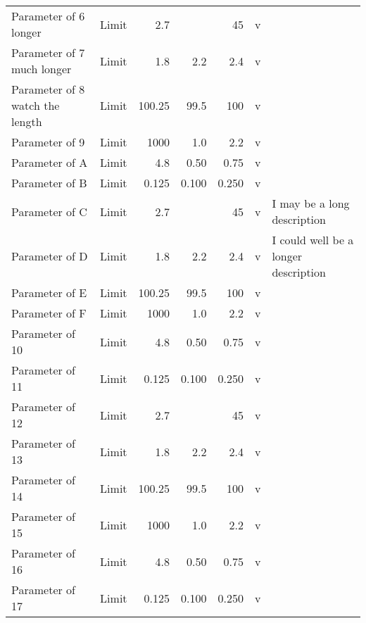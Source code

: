 \documentclass{article}
\begin{document}
\begin{ThreePartTable}
\begin{longtable}{p{5.5cm}lrrrlm{5.75cm}}
			
			\toprule
			\ltsubcap{Internal Voltage Rails}
			
			Parameter of 6 longer           & Limit         & 2.7       &           & 45        & v         &   \\
			Parameter of 7 much longer      & Limit         & 1.8       & 2.2       & 2.4       & v         &   \\
			Parameter of 8 watch the length & Limit         & 100.25    & 99.5      & 100       & v         &   \\
			Parameter of 9      & Limit     & 1000      & 1.0       & 2.2       & v         &   \\
			Parameter of A      & Limit     & 4.8       & 0.50      & 0.75      & v     &   \\
			Parameter of B      & Limit     & 0.125     & 0.100     & 0.250     & v         &   \\
			
			Parameter of C      & Limit         & 2.7       &           & 45        & v         &   I may be a long description \\
			Parameter of D      & Limit         & 1.8       & 2.2       & 2.4       & v         &   I could well be a longer description\\
			Parameter of E      & Limit         & 100.25    & 99.5      & 100       & v         &   \\
			Parameter of F      & Limit     & 1000      & 1.0       & 2.2       & v         &   \\
			Parameter of 10     & Limit     & 4.8       & 0.50      & 0.75      & v     &   \\
			Parameter of 11     & Limit     & 0.125     & 0.100     & 0.250     & v         &   \\
			
			\toprule
			\ltsubcap{Voltage Reference}
			
			Parameter of 12     & Limit         & 2.7       &           & 45        & v         &       \\
			Parameter of 13     & Limit         & 1.8       & 2.2       & 2.4       & v         &       \\
			Parameter of 14     & Limit         & 100.25    & 99.5      & 100       & v         &       \\
			Parameter of 15     & Limit         & 1000      & 1.0       & 2.2       & v         &       \\
			Parameter of 16     & Limit         & 4.8       & 0.50      & 0.75      & v         &       \\
			Parameter of 17     & Limit         & 0.125     & 0.100     & 0.250     & v         &       \\
			

\end{longtable}
\end{ThreePartTable}
\end{document}
